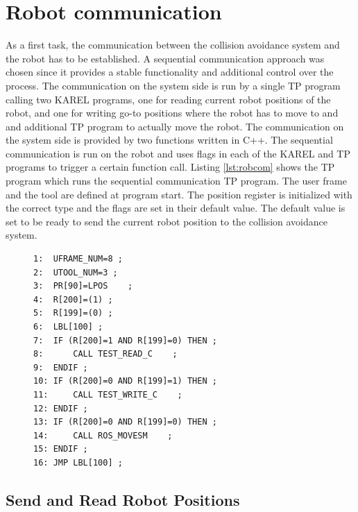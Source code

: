 \section{Robot communication}                          
\label{sec:robcom}                                     
As a first task, the communication between the collision avoidance system and the robot has to be established. A sequential communication approach was chosen since it provides a stable functionality and additional control over the process. The communication on the system side is run by a single TP program calling two KAREL programs, one for reading current robot positions of the robot, and one for writing go-to positions where the robot has to move to and and additional TP program to actually move the robot. The communication on the system side is provided by two functions written in C++. The sequential communication is run on the robot and uses flags in each of the KAREL and TP programs to trigger a certain function call. Listing \ref{lst:robcom} shows the TP program which runs the sequential communication TP program. The user frame and the tool are defined at program start. The position register is initialized with the correct type and the flags are set in their default value. The default value is set to be ready to send the current robot position to the collision avoidance system.
\begin{figure}[H]
\begin{lstlisting}[frame = single, caption={TP Program which enables the sequential communication.}, captionpos=b, label={lst:robcom}]
1:  UFRAME_NUM=8 ;
2:  UTOOL_NUM=3 ;
3:  PR[90]=LPOS    ;
4:  R[200]=(1) ;
5:  R[199]=(0) ;
6:  LBL[100] ;
7:  IF (R[200]=1 AND R[199]=0) THEN ;
8:  	CALL TEST_READ_C    ;
9:  ENDIF ;
10: IF (R[200]=0 AND R[199]=1) THEN ;
11:  	CALL TEST_WRITE_C    ;
12: ENDIF ;
13: IF (R[200]=0 AND R[199]=0) THEN ;
14:  	CALL ROS_MOVESM    ;
15: ENDIF ;
16: JMP LBL[100] ;
\end{lstlisting}
\end{figure} 				                                              
\subsection{Send and Read Robot Positions}   
          

